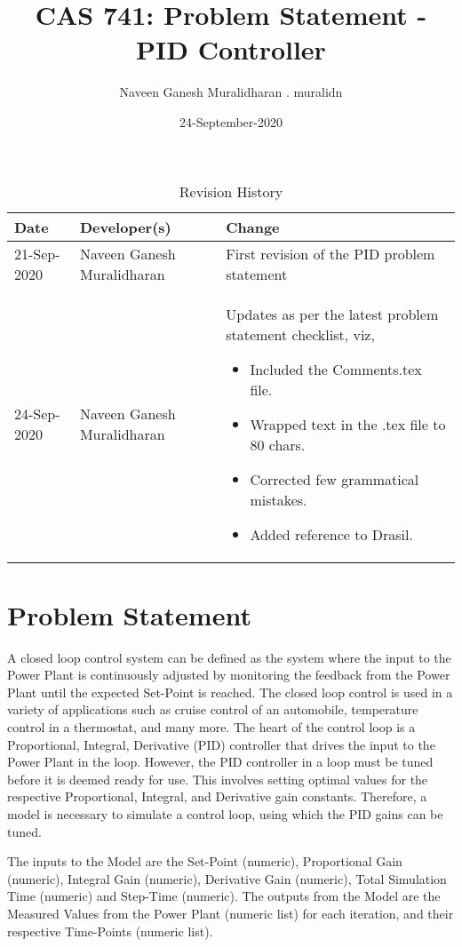 \documentclass{article}
\title{CAS 741: Problem Statement - \\PID Controller}
\author{Naveen Ganesh Muralidharan . muralidn}
\date{24-September-2020}
\begin{document}
\maketitle

\begin{table}[hp]
\caption{Revision History} \label{TblRevisionHistory}
\begin{tabularx}{\textwidth}{llX}
\toprule
\textbf{Date} & \textbf{Developer(s)} & \textbf{Change}\\
\midrule
21-Sep-2020 & Naveen Ganesh Muralidharan & First revision of the PID problem 
statement\\
24-Sep-2020 & Naveen Ganesh Muralidharan & Updates as per the latest problem
statement checklist, viz,
\begin{itemize}
\item Included the Comments.tex file. 
\item Wrapped text in the .tex file to 80 chars. 
\item Corrected few grammatical mistakes.
\item Added reference to Drasil.
\end{itemize}\\
\bottomrule
\end{tabularx}
\end{table}

\section*{Problem Statement}

A closed loop control system can be defined as the system where the input to the 
Power Plant is continuously adjusted by monitoring the feedback from the Power 
Plant until the expected Set-Point is reached. The closed loop control is used 
in a variety of applications such as cruise control of an automobile, 
temperature control in a thermostat, and many more. The heart of the control 
loop is a  Proportional, Integral, Derivative (PID) controller that drives the 
input to the Power Plant in the loop. However, the PID controller in a loop must 
be tuned before it is deemed ready for use. This involves setting optimal values 
for the respective Proportional, Integral, and Derivative gain constants. 
Therefore, a model is necessary to simulate  a control loop, using which the 
PID gains can be tuned.

The inputs to the Model are the Set-Point (numeric), Proportional Gain 
(numeric), Integral Gain (numeric), Derivative Gain (numeric), Total 
Simulation Time (numeric) and Step-Time (numeric). The outputs from the Model 
are the Measured Values from the Power Plant (numeric list) for each iteration, 
and their respective Time-Points (numeric list).
\end{document}
